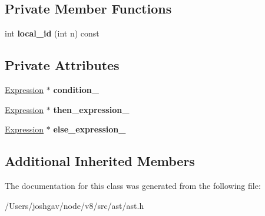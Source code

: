 \subsection*{Private Member Functions}
\begin{DoxyCompactItemize}
\item 
int {\bfseries local\+\_\+id} (int n) const \hypertarget{classv8_1_1internal_1_1_conditional_a080675f1ab5df1943d83f17bfb277d0f}{}\label{classv8_1_1internal_1_1_conditional_a080675f1ab5df1943d83f17bfb277d0f}

\end{DoxyCompactItemize}
\subsection*{Private Attributes}
\begin{DoxyCompactItemize}
\item 
\hyperlink{classv8_1_1internal_1_1_expression}{Expression} $\ast$ {\bfseries condition\+\_\+}\hypertarget{classv8_1_1internal_1_1_conditional_a3f2e7134fe94f954f250f261fab93c5f}{}\label{classv8_1_1internal_1_1_conditional_a3f2e7134fe94f954f250f261fab93c5f}

\item 
\hyperlink{classv8_1_1internal_1_1_expression}{Expression} $\ast$ {\bfseries then\+\_\+expression\+\_\+}\hypertarget{classv8_1_1internal_1_1_conditional_a6cad5bd1a4a6fabfafc44f6245d9dfe4}{}\label{classv8_1_1internal_1_1_conditional_a6cad5bd1a4a6fabfafc44f6245d9dfe4}

\item 
\hyperlink{classv8_1_1internal_1_1_expression}{Expression} $\ast$ {\bfseries else\+\_\+expression\+\_\+}\hypertarget{classv8_1_1internal_1_1_conditional_a0b8e530275bcb70c18cd8f41f72f8185}{}\label{classv8_1_1internal_1_1_conditional_a0b8e530275bcb70c18cd8f41f72f8185}

\end{DoxyCompactItemize}
\subsection*{Additional Inherited Members}


The documentation for this class was generated from the following file\+:\begin{DoxyCompactItemize}
\item 
/\+Users/joshgav/node/v8/src/ast/ast.\+h\end{DoxyCompactItemize}
